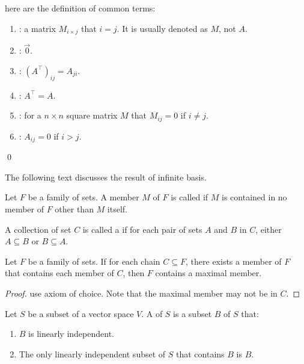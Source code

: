 \begin{definition}
    here are the definition of common terms:
    \begin{enumerate}
        \item {}: a matrix $M_{i \times j}$ that $i = j$. It is usually denoted as $M$, not $A$.
        \item {}: $\vec{0}$.
        \item {}: $\left(A^\top\right)_{ij} = A_{ji}$.
        \item {}: $A^\top = A$.
        \item {}: for a $n \times n$ square matrix $M$ that $M_{ij} = 0$ if $i \neq j$.
        \item {}: $A_{ij} = 0$ if $i > j$.
    \end{enumerate}
    \qed    
\end{definition}



The following text discusses the result of infinite basis.

\begin{definition}
    Let $F$ be a family of sets. A member $M$ of $F$ is called  if $M$ is contained in no member of $F$ other than $M$ itself.
\end{definition}

\begin{definition}
    A collection of set $C$ is called a  if for each pair of sets $A$ and $B$ in $C$, either $A \subseteq B$ or $B \subseteq A$.
\end{definition}

\begin{theorem}
    Let $F$ be a family of sets. If for each chain $C \subseteq F$, there exists a member of $F$ that contains each member of $C$, then $F$ contains a maximal member.    
\end{theorem}

\begin{proof}
    use axiom of choice. Note that the maximal member may not be in $C$.
\end{proof}

\begin{definition}
    Let $S$ be a subset of a vector space $V$. A  of $S$ is a subset $B$ of $S$ that:
    \begin{enumerate}
        \item $B$ is linearly independent.
        \item The only linearly independent subset of $S$ that contains $B$ is $B$.
    \end{enumerate}
\end{definition}

